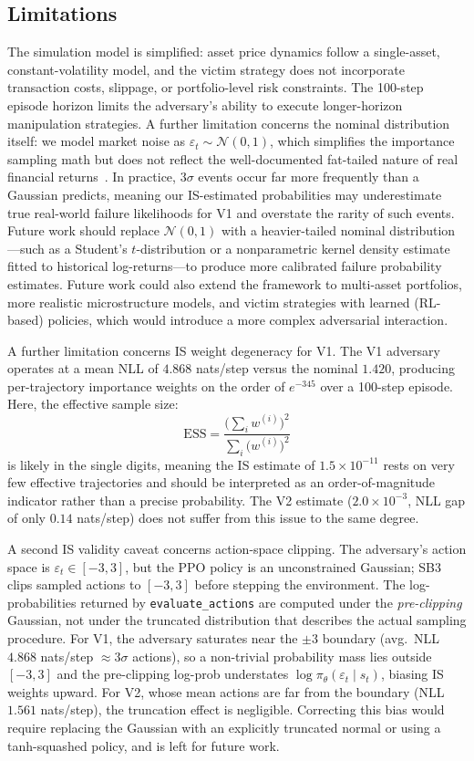 \documentclass[conference]{IEEEtran}
\begin{document}
\subsection*{Limitations}\label{sec:limitations}
The simulation model is simplified: asset price dynamics follow a
single-asset, constant-volatility model, and the victim strategy does
not incorporate transaction costs, slippage, or portfolio-level risk
constraints. The 100-step episode horizon limits the adversary's ability
to execute longer-horizon manipulation strategies. A further limitation
concerns the nominal distribution itself: we model market noise as
$\varepsilon_t \sim \mathcal{N}(0,1)$, which simplifies the importance
sampling math but does not reflect the well-documented fat-tailed nature
of real financial returns~\cite{cont2001empirical}. In practice, $3\sigma$
events occur far more frequently than a Gaussian predicts, meaning our
IS-estimated probabilities may underestimate true real-world failure
likelihoods for V1 and overstate the rarity of such events. Future work
should replace $\mathcal{N}(0,1)$ with a heavier-tailed nominal
distribution---such as a Student's $t$-distribution or a nonparametric
kernel density estimate fitted to historical log-returns---to produce
more calibrated failure probability estimates. Future work could also
extend the framework to multi-asset portfolios, more realistic
microstructure models, and victim strategies with learned (RL-based)
policies, which would introduce a more complex adversarial interaction.

A further limitation concerns IS weight degeneracy for V1. The V1
adversary operates at a mean NLL of $4.868$ nats/step versus the
nominal $1.420$, producing per-trajectory importance weights on the
order of $e^{-345}$ over a 100-step episode. Here, the
effective sample size:
\[
  \mathrm{ESS} = \frac{\bigl(\sum_i w^{(i)}\bigr)^2}{\sum_i \bigl(w^{(i)}\bigr)^2}
\]
is likely in the single digits, meaning the IS estimate of
$1.5\!\times\!10^{-11}$ rests on very few effective trajectories and
should be interpreted as an order-of-magnitude indicator rather than a
precise probability. The V2 estimate ($2.0\!\times\!10^{-3}$, NLL gap
of only $0.14$ nats/step) does not suffer from this issue to the same
degree.

A second IS validity caveat concerns action-space clipping.
The adversary's action space is $\varepsilon_t\in[-3,3]$, but the PPO policy
is an unconstrained Gaussian; SB3 clips sampled actions to $[-3,3]$ before
stepping the environment. The log-probabilities returned by
\texttt{evaluate\_actions} are computed under the \emph{pre-clipping}
Gaussian, not under the truncated distribution that describes the actual
sampling procedure. For V1, the adversary saturates near the $\pm 3$
boundary (avg.\ NLL $4.868$ nats/step $\approx 3\sigma$ actions), so a
non-trivial probability mass lies outside $[-3,3]$ and the pre-clipping
log-prob understates $\log\pi_\theta(\varepsilon_t\mid s_t)$, biasing IS
weights upward. For V2, whose mean actions are far from the boundary (NLL
$1.561$ nats/step), the truncation effect is negligible. Correcting this
bias would require replacing the Gaussian with an explicitly truncated
normal or using a tanh-squashed policy, and is left for future work.
\end{document}
